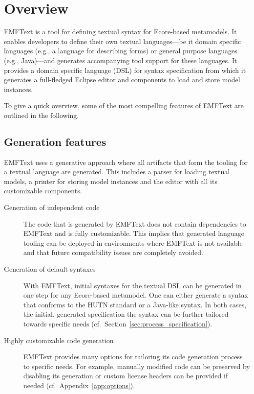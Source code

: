 \chapter{Overview}
EMFText is a tool for defining textual syntax for Ecore-based metamodels. It 
enables developers to define their own textual languages---be it domain
specific languages (e.g., a language for describing forms) or general purpose 
languages (e.g., Java)---and generates accompanying tool support for these 
languages. It provides a domain specific language (DSL) for syntax 
specification from which it generates a full-fledged Eclipse editor and 
components to load and store model instances.

To give a quick overview, some of the most compelling features of EMFText are 
outlined in the following.

\section{Generation features}
EMFText uses a generative approach where all artifacts that form the tooling for
a textual language are generated. This includes a parser for loading textual 
models, a printer for storing model instances and the editor with all its
customizable components.

\begin{description}

  \item[Generation of independent code]
        The code that is generated by EMFText does not contain dependencies
        to EMFText and is fully customizable. This implies that generated 
        language tooling can be deployed in environments where EMFText is not 
        available and that future compatibility issues are completely avoided.

  \item[Generation of default syntaxes]
        With EMFText, initial syntaxes for the textual DSL can be generated 
        in one step for any Ecore-based metamodel. One can either generate a
        syntax that conforms to the HUTN standard or a Java-like syntax. In
        both cases, the initial, generated specification the syntax
        can be further tailored towards specific needs 
        (cf.~Section~\ref{sec:process_specification}).
        
  \item[Highly customizable code generation]
        EMFText provides many options for tailoring its code generation process
        to specific needs. For example, manually modified code can be preserved
        by disabling its generation or custom license headers can be provided 
        if needed (cf.~Appendix~\ref{app:options}\label{app:options}).

\end{description}


